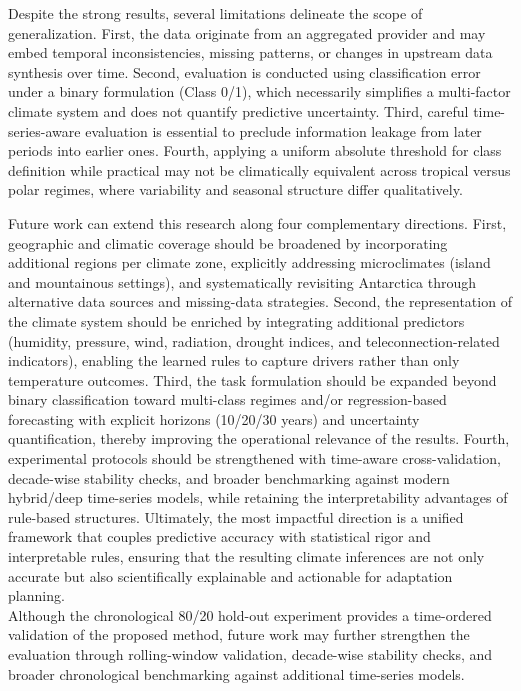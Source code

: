 \documentclass[12pt]{Definitions/academia}
\begin{document}
Despite the strong results, several limitations delineate the scope
of generalization. First, the data originate from an aggregated provider
and may embed temporal inconsistencies, missing patterns, or changes
in upstream data synthesis over time. Second, evaluation is conducted
using classification error under a binary formulation (Class 0/1),
which necessarily simplifies a multi-factor climate system and does
not quantify predictive uncertainty. Third, careful time-series-aware
evaluation is essential to preclude information leakage from later
periods into earlier ones. Fourth, applying a uniform absolute threshold for class definition while practical may
not be climatically equivalent across tropical versus polar regimes,
where variability and seasonal structure differ qualitatively.

Future work can extend this research along four complementary directions.
First, geographic and climatic coverage should be broadened by incorporating
additional regions per climate zone, explicitly addressing microclimates
(island and mountainous settings), and systematically revisiting Antarctica
through alternative data sources and missing-data strategies. Second,
the representation of the climate system should be enriched by integrating
additional predictors (humidity, pressure, wind, radiation, drought
indices, and teleconnection-related indicators), enabling the learned
rules to capture drivers rather than only temperature outcomes. Third,
the task formulation should be expanded beyond binary classification
toward multi-class regimes and/or regression-based forecasting with
explicit horizons (10/20/30 years) and uncertainty quantification,
thereby improving the operational relevance of the results. Fourth,
experimental protocols should be strengthened with time-aware cross-validation,
decade-wise stability checks, and broader benchmarking against modern
hybrid/deep time-series models, while retaining the interpretability
advantages of rule-based structures. Ultimately, the most impactful
direction is a unified framework that couples predictive accuracy
with statistical rigor and interpretable rules, ensuring that the
resulting climate inferences are not only accurate but also scientifically
explainable and actionable for adaptation planning.
\\
Although the chronological 80/20 hold-out experiment provides a time-ordered validation of the proposed method, future work may further strengthen the evaluation through rolling-window validation, decade-wise stability checks, and broader chronological benchmarking against additional time-series models.
\end{document}
